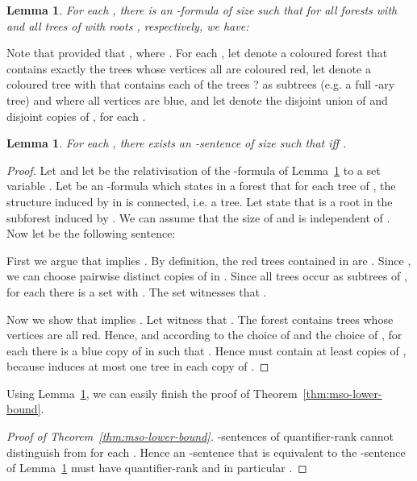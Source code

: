\documentclass[11pt]{article}
\newtheorem{lemma}[theorem]{Lemma}
\begin{document}
\begin{lemma}
  \label{lem:eq-formula}
  For each , there is an -formula 
  of size  such that for all forests
   with  and all trees  of  with roots
  , respectively, we have:
  
\end{lemma}

Note that  provided that , where .
For each , let  denote a coloured forest that contains exactly the trees  whose vertices all are coloured red, let  denote a
coloured tree with  that contains each of the trees
? as subtrees (e.g. a full -ary
tree) and where all vertices are blue, and let  denote the disjoint
union of  and  disjoint copies of , for each .

\begin{lemma}
  \label{lem:mso-lower-bound-main-lemma}
  For each , there exists an -sentence
   of size  such that  iff .
\end{lemma}
\begin{proof}
  Let  and let  be the
  relativisation of the -formula of Lemma~\ref{lem:eq-formula}
  to a set variable . Let  be an -formula
  which states in a forest  that for each tree  of ,
  the structure induced by  in  is connected, i.e. a tree.
  Let  state that  is a root in the
  subforest induced by .
  We can assume that the size of  and  is independent
  of .
  Now let  be the following sentence:
  
  First we argue that  implies .
  By definition, the red trees contained in  are . Since , we can choose
   pairwise distinct copies  of 
  in . Since all trees 
  occur as subtrees of , for each 
  there is a set  with .  The set  witnesses that .
  
  Now we show that  implies .
  Let  witness that
  . The forest  contains trees
   whose vertices are all red. Hence, and according to the
  choice of  and the choice of , for
  each  there is a
  blue copy  of  in  such that
  . Hence  must contain at least
   copies of , because  induces at most one tree in
  each copy of .
\end{proof}

Using Lemma~\ref{lem:mso-lower-bound-main-lemma}, we can easily finish the proof
of Theorem~\ref{thm:mso-lower-bound}.

\begin{proof}[Proof of Theorem~\ref{thm:mso-lower-bound}]  
  -sentences of quantifier-rank  cannot distinguish 
  from  for each . Hence an -sentence
   that is equivalent to the -sentence  of
  Lemma~\ref{lem:mso-lower-bound-main-lemma} must have quantifier-rank
   and in particular .
\end{proof}
\end{document}
